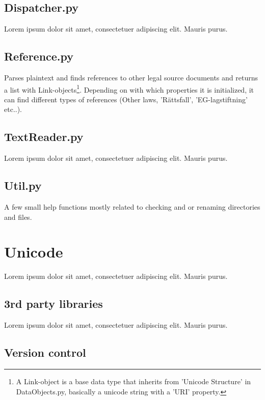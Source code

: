 \documentclass[a4paper,11pt]{kth-mag}
\begin{document}
\subsection{Dispatcher.py}

Lorem ipsum dolor sit amet, consectetuer adipiscing elit. Mauris
purus. 

\subsection{Reference.py}

Parses plaintext and finds references to other legal source documents and
returns a list with Link-objects\footnote{A Link-object is a base data type
that inherits from 'Unicode Structure' in DataObjects.py, basically a unicode
string with a 'URI' property.}. Depending on with which properties it is
initialized, it can find different types of references (Other laws,
'Rättsfall', 'EG-lagstiftning' etc..).

\subsection{TextReader.py}

Lorem ipsum dolor sit amet, consectetuer adipiscing elit. Mauris
purus. 

\subsection{Util.py}

A few small help functions mostly related to checking and or renaming directories and files. 

\section{Unicode}

Lorem ipsum dolor sit amet, consectetuer adipiscing elit. Mauris
purus. 

\subsection{3rd party libraries}

Lorem ipsum dolor sit amet, consectetuer adipiscing elit. Mauris
purus. 

\subsection{Version control}
\end{document}
